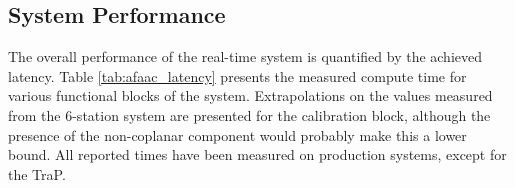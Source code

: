 \documentclass{ws-jai}
\begin{document}




\subsection {System Performance}
The overall  performance of the real-time  system is quantified by  the achieved
latency. Table  \ref{tab:afaac_latency} presents  the measured compute  time for
various functional blocks  of the system. Extrapolations on  the values measured
from the 6-station system are presented  for the calibration block, although the
presence of the  non-coplanar component would probably make this  a lower bound.
All reported  times have  been measured  on production  systems, except  for the
TraP.
\end{document}
